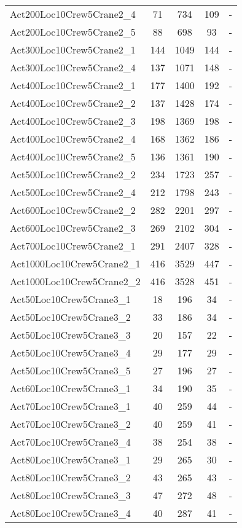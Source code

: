 \begin{center}
\begin{longtable}{ | l | c | c | c | c | }
Act200Loc10Crew5Crane2\_4	&	71	&	734	&	109	&	-	\\	
Act200Loc10Crew5Crane2\_5	&	88	&	698	&	93	&	-	\\	
Act300Loc10Crew5Crane2\_1	&	144	&	1049	&	144	&	-	\\	
Act300Loc10Crew5Crane2\_4	&	137	&	1071	&	148	&	-	\\	
Act400Loc10Crew5Crane2\_1	&	177	&	1400	&	192	&	-	\\	
Act400Loc10Crew5Crane2\_2	&	137	&	1428	&	174	&	-	\\	
Act400Loc10Crew5Crane2\_3	&	198	&	1369	&	198	&	-	\\	
Act400Loc10Crew5Crane2\_4	&	168	&	1362	&	186	&	-	\\	
Act400Loc10Crew5Crane2\_5	&	136	&	1361	&	190	&	-	\\	
Act500Loc10Crew5Crane2\_2	&	234	&	1723	&	257	&	-	\\	
Act500Loc10Crew5Crane2\_4	&	212	&	1798	&	243	&	-	\\	
Act600Loc10Crew5Crane2\_2	&	282	&	2201	&	297	&	-	\\	
Act600Loc10Crew5Crane2\_3	&	269	&	2102	&	304	&	-	\\	
Act700Loc10Crew5Crane2\_1	&	291	&	2407	&	328	&	-	\\	
Act1000Loc10Crew5Crane2\_1	&	416	&	3529	&	447	&	-	\\	
Act1000Loc10Crew5Crane2\_2	&	416	&	3528	&	451	&	-	\\ \hline
Act50Loc10Crew5Crane3\_1	&	18	&	196	&	34	&   -\\
Act50Loc10Crew5Crane3\_2	&	33	&	186	&	34	&   -\\
Act50Loc10Crew5Crane3\_3	&	20	&	157	&	22	&   -\\
Act50Loc10Crew5Crane3\_4	&	29	&	177	&	29	&   -\\
Act50Loc10Crew5Crane3\_5	&	27	&	196	&	27	&   -\\
Act60Loc10Crew5Crane3\_1	&	34	&	190	&	35	&   -\\
Act70Loc10Crew5Crane3\_1	&	40	&	259	&	44	&   -\\
Act70Loc10Crew5Crane3\_2	&	40	&	259	&	41	&   -\\
Act70Loc10Crew5Crane3\_4	&	38	&	254	&	38	&   -\\
Act80Loc10Crew5Crane3\_1	&	29	&	265	&	30	&   -\\
Act80Loc10Crew5Crane3\_2	&	43	&	265	&	43	&   -\\
Act80Loc10Crew5Crane3\_3	&	47	&	272	&	48	&   -\\
Act80Loc10Crew5Crane3\_4	&	40	&	287	&	41	&   -\\

\end{longtable}
\end{center}
